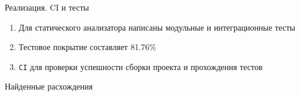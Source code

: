 \documentclass
  [ russian
  , aspectratio=169 %
  ] {beamer}
\begin{document}
\begin{frame}[fragile]{Реализация. CI и тесты}

    \begin{enumerate}
        \item Для статического анализатора написаны модульные и интеграционные тесты
        \item Тестовое покрытие составляет 81.76\%
        \item \texttt{CI} для проверки успешности сборки проекта и прохождения тестов
    \end{enumerate}

\end{frame}



\begin{frame}{Найденные расхождения}


\end{frame}
\end{document}
